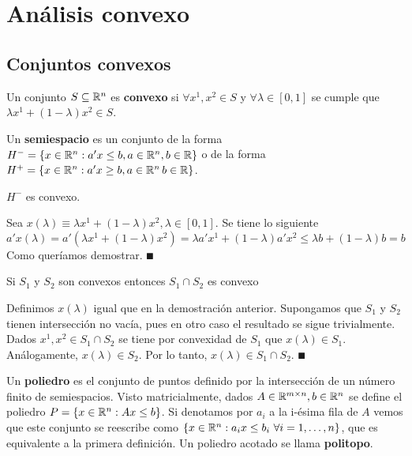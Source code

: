 \documentclass[PM.tex]{subfiles}
\begin{document}
\chapter{Análisis convexo}
\section{Conjuntos convexos}

\begin{defi}
Un conjunto $S\subseteq\mathbb{R}^n$ es \textbf{convexo} si $\forall x^1,x^2\in S$ y $\forall  \lambda\in[0,1]$ se cumple que $\lambda x^1 + (1-\lambda)x^2\in S$.
\end{defi}

\begin{defi}
Un \textbf{semiespacio} es un conjunto de la forma $H^-=\left\{x\in\mathbb{R}^n: a'x\leq b, a\in\mathbb{R}^n, b\in\mathbb{R}\right\}$ o de la forma $H^+=\left\{x\in\mathbb{R}^n: a'x\geq b, a\in\mathbb{R}^n\,b\in\mathbb{R}\right\}$.
\end{defi}

\begin{prop}
$H^-$ es convexo.
\end{prop}

\begin{dem}
Sea $x(\lambda)\equiv \lambda x^1 + (1-\lambda)x^2, \lambda\in[0,1]$. Se tiene lo siguiente
\[
a'x(\lambda)=a'(\lambda x^1 + (1-\lambda)x^2)=\lambda a'x^1 +(1-\lambda)a'x^2\leq \lambda b+(1-\lambda)b=b
\]
Como queríamos demostrar. $\QED$
\end{dem}

\begin{prop}
Si $S_1$ y $S_2$ son convexos entonces $S_1\cap S_2$ es convexo
\end{prop}
\begin{dem}
Definimos $x(\lambda)$ igual que en la demostración anterior. Supongamos que $S_1$ y $S_2$ tienen intersección no vacía, pues en otro caso el resultado se sigue trivialmente. Dados $x^1,x^2\in S_1 \cap S_2$ se tiene por convexidad de $S_1$ que $x(\lambda)\in S_1$. Análogamente, $x(\lambda)\in S_2$. Por lo tanto, $x(\lambda)\in S_1\cap S_2$. $\QED$
\end{dem}

\begin{defi}
Un \textbf{poliedro} es el conjunto de puntos definido por la intersección de un número finito de semiespacios. Visto matricialmente, dados $A\in\mathbb{R}^{m\times n}, b\in \mathbb{R}^n$ se define el poliedro $P=\left\{x\in \mathbb{R}^n: Ax\leq b\right\}$. Si denotamos por $a_i$ a la i-ésima fila de $A$ vemos que este conjunto se reescribe como $\left\{x\in\mathbb{R}^n: a_ix\leq b_i\ \forall i=1,\dots, n\right\}$, que es equivalente a la primera definición. Un poliedro acotado se llama \textbf{politopo}. 
\end{defi}
\end{document}

